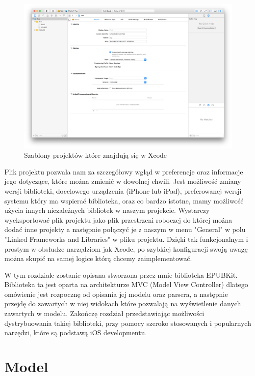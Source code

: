 \begin{figure}[ht!]
  \centering
  \includegraphics[width=120mm]{images/chapter-4-image-2-empty-project.png}
  \caption{Szablony projektów które znajdują się w Xcode}
  \label{chapter-4-image-2-empty-project}
\end{figure}

Plik projektu pozwala nam za szczegółowy wgląd w preferencje oraz informacje jego dotyczące, które można zmienić w dowolnej chwili. Jest możliwość zmiany wersji biblioteki, docelowego urządzenia (iPhone lub iPad), preferowanej wersji systemu który ma wspierać biblioteka, oraz co bardzo istotne, mamy możliwość użycia innych niezależnych bibliotek w naszym projekcie. Wystarczy wyeksportować plik projektu jako plik przestrzeni roboczej do której można dodać inne projekty a następnie połączyć je z naszym w menu "General" w polu "Linked Frameworks and Libraries" w pliku projektu. Dzięki tak funkcjonalnym i prostym w obsłudze narzędziom jak Xcode, po szybkiej konfiguracji swoją uwagę można skupić na samej logice którą chcemy zaimplementować.

W tym rozdziale zostanie opisana stworzona przez mnie biblioteka EPUBKit. Biblioteka ta jest oparta na architekturze MVC (Model View Controller) dlatego omówienie jest rozpocznę od opisania jej modelu oraz parsera, a następnie przejdę do zawartych w niej widokach które pozwalają na wyświetlenie danych zawartych w modelu. Zakończę rozdział przedstawiając możliwości dystrybuowania takiej biblioteki, przy pomocy szeroko stosowanych i popularnych narzędzi, które są podstawą iOS developmentu.

\section{Model}

